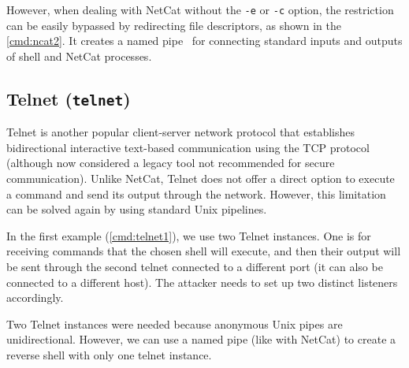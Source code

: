 
However, when dealing with NetCat without the \texttt{-e} or \texttt{-c} option, the restriction can be easily bypassed by redirecting file descriptors, as shown in the \cref{cmd:ncat2}. It creates a named pipe \tmp\ for connecting standard inputs and outputs of shell and NetCat processes.


\subsection{Telnet (\texttt{telnet})}
\label{sec:telnet}


Telnet is another popular client-server network protocol that establishes bidirectional interactive text-based communication using the TCP protocol (although now considered a legacy tool not recommended for secure communication). Unlike NetCat, Telnet does not offer a direct option to execute a command and send its output through the network. However, this limitation can be solved again by using standard Unix pipelines.

In the first example (\cref{cmd:telnet1}), we use two Telnet instances. One is for receiving commands that the chosen shell will execute, and then their output will be sent through the second telnet connected to a different port (it can also be connected to a different host). The attacker needs to set up two distinct listeners accordingly.

\newpage


Two Telnet instances were needed because anonymous Unix pipes are unidirectional. However, we can use a named pipe (like with NetCat) to create a reverse shell with only one telnet instance.

